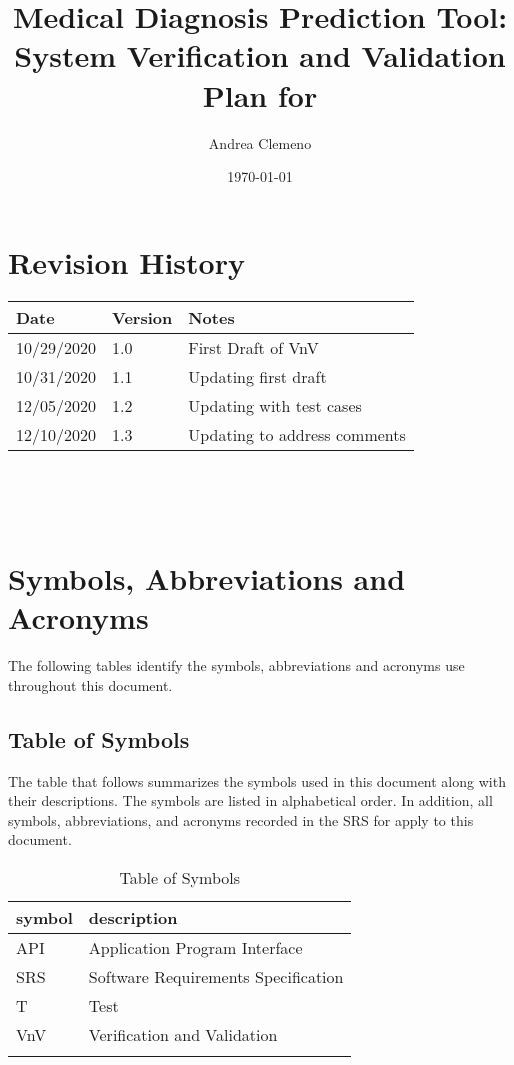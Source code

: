 \documentclass[12pt, titlepage]{article}
\begin{document}
\title{Medical Diagnosis Prediction Tool: System Verification and Validation 
Plan for \progname{}} 
\author{Andrea Clemeno}
\date{\today}
	
\maketitle


\section{Revision History}

\begin{tabularx}{\textwidth}{p{3cm}p{2cm}X}
\toprule {\bf Date} & {\bf Version} & {\bf Notes}\\
\midrule
10/29/2020  & 1.0 & First Draft of VnV\\
10/31/2020  & 1.1 & Updating first draft\\
12/05/2020  & 1.2 & Updating with test cases\\
12/10/2020  & 1.3 & Updating to address comments\\
\bottomrule
\end{tabularx}


\newpage

\tableofcontents
~\newpage
\listoftables
~\newpage

\newpage

\section{Symbols, Abbreviations and Acronyms}

The following tables identify the symbols, abbreviations and acronyms use 
throughout this document.
  
\subsection{Table of Symbols}

The table that follows summarizes the symbols used in this document along with
their descriptions. The symbols are listed in alphabetical order. In addition, 
all symbols, abbreviations, and acronyms recorded in the SRS for \progname{} 
\citep{SRS} apply to this document.


\begin{table}[H]
\renewcommand{\arraystretch}{1.2}
\noindent \begin{longtable*}{l p{8cm}} \toprule
\textbf{symbol} & \textbf{description}\\
\midrule 
API & Application Program Interface 
\\
SRS & Software Requirements Specification
\\
T & Test 
\\
VnV & Verification and Validation 
\\
&\\
\bottomrule

\end{longtable*}
\caption{Table of Symbols}
\end{table}
\end{document}
